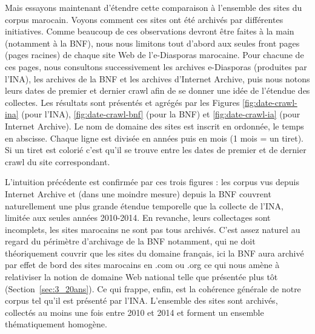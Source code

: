 \documentclass[symmetric,justified,marginals=raggedouter]{tufte-book}
\begin{document}
\noindent Mais essayons maintenant d'étendre cette comparaison à l'ensemble des sites du corpus marocain. Voyons comment ces sites ont été archivés par différentes initiatives. Comme beaucoup de ces observations devront être faites à la main (notamment à la BNF), nous nous limitons tout d'abord aux seules front pages (pages racines) de chaque site Web de l'e-Diasporas marocaine. Pour chacune de ces pages, nous consultons successivement les archives e-Diasporas (produites par l'INA), les archives de la BNF et les archives d'Internet Archive, puis nous notons leurs dates de premier et dernier crawl afin de se donner une idée de l'étendue des collectes. Les résultats sont présentés et agrégés par les Figures \ref{fig:date-crawl-ina} (pour l'INA), \ref{fig:date-crawl-bnf} (pour la BNF) et \ref{fig:date-crawl-ia} (pour Internet Archive). Le nom de domaine des sites est inscrit en ordonnée, le temps en abscisse. Chaque ligne est divisée en années puis en mois (1 mois = un tiret). Si un tiret est colorié c'est qu'il se trouve entre les dates de premier et de dernier crawl du site correspondant.

\iffalse

\begin{figure*}[hbtp]%
  \texttt{[image: graphics/crawl-1]}
  \caption{Préservation dans le temps des sites de l'e-Diaspora marocaine par l'INA (tirets jaunes)}
  \label{fig:date-crawl-ina}
\end{figure*}


\begin{figure*}[hbtp]%
  \texttt{[image: graphics/crawl-2]}
  \caption{Préservation dans le temps des sites de l'e-Diaspora marocaine par la BNF (tirets rouges)}
  \label{fig:date-crawl-bnf}
\end{figure*}

\begin{figure*}[hbtp]%
  \texttt{[image: graphics/crawl-3]}
  \caption{Préservation dans le temps des sites de l'e-Diaspora marocaine par Internet Archive (tirets bleus)}
  \label{fig:date-crawl-ia}
\end{figure*}

\fi

L'intuition précédente est confirmée par ces trois figures : les corpus vus depuis Internet Archive et (dans une moindre mesure) depuis la BNF couvrent naturellement une plus grande étendue temporelle que la collecte de l'INA, limitée aux seules années 2010-2014. En revanche, leurs collectages sont incomplets, les sites marocains ne sont pas tous archivés. C'est assez naturel au regard du périmètre d'archivage de la BNF notamment, qui ne doit théoriquement couvrir que les sites du domaine français, ici la BNF aura archivé par effet de bord des sites marocains en .com ou .org ce qui nous amène à relativiser la notion de domaine Web national telle que présentée plus tôt (Section~\ref{sec:3_20ans}). Ce qui frappe, enfin, est la cohérence générale de notre corpus tel qu'il est présenté par l'INA. L'ensemble des sites sont archivés, collectés au moins une fois entre 2010 et 2014 et forment un ensemble thématiquement homogène. 
\end{document}
